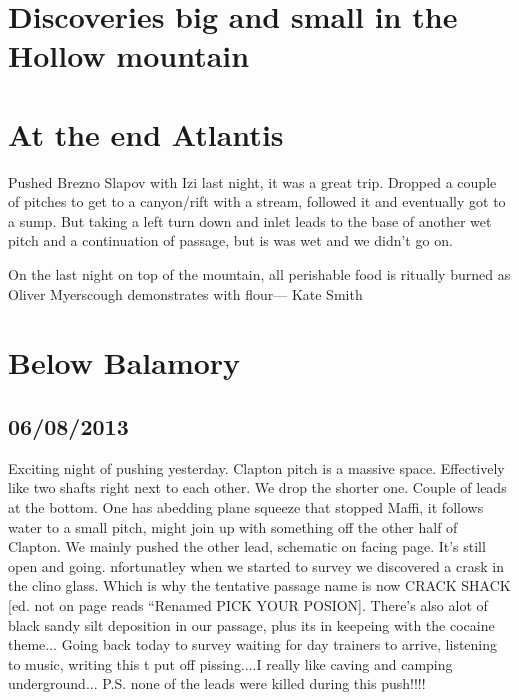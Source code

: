 \section{Discoveries big and small in the Hollow mountain}

\begin{marginfigure}
\end{marginfigure}

\section{ At the end Atlantis}
Pushed Brezno Slapov with Izi last night, it was a great trip. Dropped a couple of pitches to get to a canyon/rift with a stream, followed it and eventually got to a sump. But taking a left turn down and inlet leads to the base of another wet pitch and a continuation of passage, but is was wet and we didn’t go on.

\begin{marginfigure}
\centering
{}
\label{Olifire}
\caption{On the last night on top of the mountain, all perishable food is ritually burned as Oliver Myerscough demonstrates with flour--- Kate Smith}
\end{marginfigure}

\section{Below Balamory}
\subsection{06/08/2013}
Exciting night of pushing yesterday. Clapton pitch is a massive space. Effectively like two shafts right next to each other. We drop the shorter one. Couple of leads at the bottom. One has abedding plane squeeze that stopped Maffi, it follows water to a small pitch, might join up with something off the other half of Clapton.
We mainly pushed the other lead, schematic on facing page. It’s still open and going. nfortunatley when we started to survey we discovered a crask in the clino glass. Which is why the tentative passage name is now CRACK SHACK [ed. not on page reads “Renamed PICK YOUR POSION]. There’s also alot of black sandy silt deposition in our passage, plus its in keepeing with the cocaine theme...
Going back today to survey waiting for day trainers to arrive, listening to music, writing this t put off pissing....I really like caving and camping underground...
P.S. none of the leads were killed during this push!!!!

